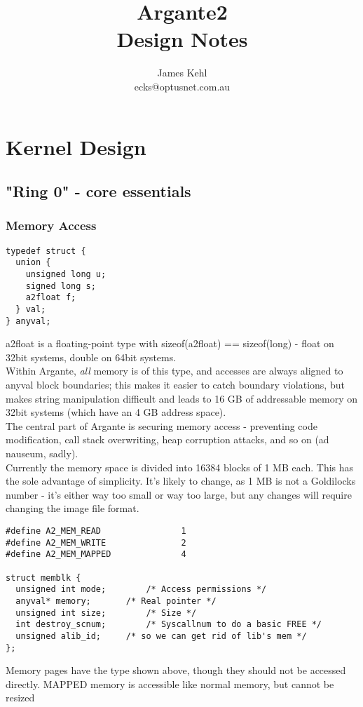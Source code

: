 \documentclass[a4paper,oneside,openany]{book}
\title{\Huge{Argante2}\\\huge{Design Notes}}
\author{
	\LARGE{James Kehl}\\
	ecks@optusnet.com.au
}
\begin{document}
\maketitle{}

\chapter{Kernel Design}
\section{"Ring 0" - core essentials}
\subsection{Memory Access}
\begin{verbatim}
typedef struct {
  union {
    unsigned long u;
    signed long s;
    a2float f;
  } val;
} anyval;
\end{verbatim}
a2float is a floating-point type with sizeof(a2float) == sizeof(long) - float on
32bit systems, double on 64bit systems.\smallskip\\
Within Argante, \emph{all} memory is of this type, and accesses are always aligned
to anyval block boundaries; this makes it easier to catch boundary violations, but
makes string manipulation difficult and leads to 16 GB of addressable memory on
32bit systems (which have an 4 GB address space).\smallskip\\
The central part of Argante is securing memory access - preventing code
modification, call stack overwriting, heap corruption attacks, and so on
(ad nauseum, sadly).\smallskip\\
Currently the memory space is divided into 16384 blocks of 1 MB each. This has the
sole advantage of simplicity. It's likely to change, as 1 MB is not a Goldilocks
number - it's either way too small or way too large, but any changes will require
changing the image file format.
\newpage
\begin{verbatim}
#define A2_MEM_READ                1
#define A2_MEM_WRITE               2
#define A2_MEM_MAPPED              4

struct memblk {
  unsigned int mode;		/* Access permissions */
  anyval* memory;		/* Real pointer */
  unsigned int size;		/* Size */
  int destroy_scnum;		/* Syscallnum to do a basic FREE */
  unsigned alib_id;		/* so we can get rid of lib's mem */
};
\end{verbatim}
Memory pages have the type shown above, though they should not be accessed
directly. MAPPED memory is accessible like normal memory, but cannot be resized
\end{document}

